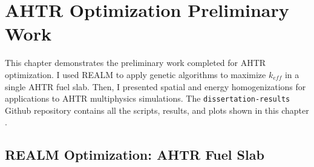 \chapter{AHTR Optimization Preliminary Work}
\label{chap:realm-demo}
This chapter demonstrates the preliminary work completed for \gls{AHTR} optimization. 
I used \gls{REALM} to apply genetic algorithms to maximize $k_{eff}$ in a single 
\gls{AHTR} fuel slab. 
Then, I presented spatial and energy homogenizations for applications to 
\gls{AHTR} multiphysics simulations.
The \texttt{dissertation-results} Github repository contains all the scripts, 
results, and plots shown in this chapter \cite{chee_dissertation-results_2021}.

\section{REALM Optimization: AHTR Fuel Slab}
\label{sec:realm_opt_ahtr_slab}
